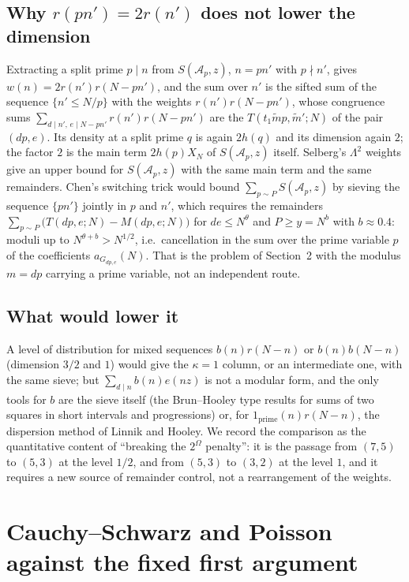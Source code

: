 \documentclass[11pt,a4paper]{article}
\theoremstyle{remark}
\theoremstyle{definition}
\newcommand{\cA}{\mathcal A}
\begin{document}
\subsection{Why $r(pn')=2r(n')$ does not lower the dimension}
Extracting a split prime $p\mid n$ from $S(\cA_p,z)$, $n=pn'$ with $p\nmid n'$, gives $w(n)=2r(n')r(N-pn')$, and the sum over $n'$ is the sifted sum of the sequence $\{n'\le N/p\}$ with the weights $r(n')r(N-pn')$, whose congruence sums $\sum_{d\mid n',\,e\mid N-pn'}r(n')r(N-pn')$ are the $T(t_1\tilde mp,\tilde m';N)$ of the pair $(dp,e)$. Its density at a split prime $q$ is again $2h(q)$ and its dimension again $2$; the factor $2$ is the main term $2h(p)X_N$ of $S(\cA_p,z)$ itself. Selberg's $\Lambda^2$ weights give an upper bound for $S(\cA_p,z)$ with the same main term and the same remainders. Chen's switching trick would bound $\sum_{p\sim P}S(\cA_p,z)$ by sieving the sequence $\{pn'\}$ jointly in $p$ and $n'$, which requires the remainders $\sum_{p\sim P}\bigl(T(dp,e;N)-M(dp,e;N)\bigr)$ for $de\le N^{\theta}$ and $P\ge y=N^b$ with $b\approx0.4$: moduli up to $N^{\theta+b}>N^{1/2}$, i.e.\ cancellation in the sum over the prime variable $p$ of the coefficients $a_{G_{dp,e}}(N)$. That is the problem of Section~2 with the modulus $m=dp$ carrying a prime variable, not an independent route.

\subsection{What would lower it}
A level of distribution for mixed sequences $b(n)r(N-n)$ or $b(n)b(N-n)$ (dimension $3/2$ and $1$) would give the $\kappa=1$ column, or an intermediate one, with the same sieve; but $\sum_{d\mid n}b(n)e(nz)$ is not a modular form, and the only tools for $b$ are the sieve itself (the Brun--Hooley type results for sums of two squares in short intervals and progressions) or, for $1_{\mathrm{prime}}(n)r(N-n)$, the dispersion method of Linnik and Hooley. We record the comparison as the quantitative content of ``breaking the $2^\Omega$ penalty'': it is the passage from $(7,5)$ to $(5,3)$ at the level $1/2$, and from $(5,3)$ to $(3,2)$ at the level $1$, and it requires a new source of remainder control, not a rearrangement of the weights.

\section{Cauchy--Schwarz and Poisson against the fixed first argument}
\end{document}
